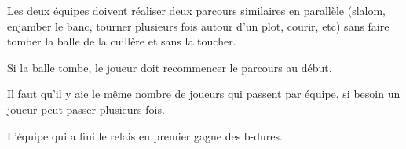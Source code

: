 \documentclass{grand-jeu}
\begin{document}
\begin{liste-materiel}
\end{liste-materiel}


\begin{regles}
Les deux équipes doivent réaliser deux parcours similaires en parallèle (slalom, enjamber le banc, tourner plusieurs fois autour d'un plot, courir, etc) sans faire tomber la balle de la cuillère et sans la toucher. 

Si la balle tombe, le joueur doit recommencer le parcours au début.

Il faut qu'il y aie le même nombre de joueurs qui passent par équipe, si besoin un joueur peut passer plusieurs fois.

L'équipe qui a fini le relais en premier gagne des b-dures. 
\end{regles}

\begin{imaginaire}
\end{imaginaire}

\begin{moments-stop}
\end{moments-stop}
\end{document}
